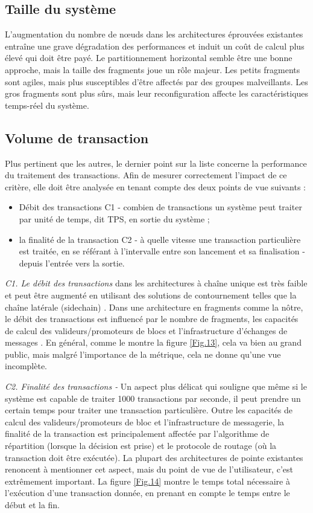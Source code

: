 \documentclass[journal]{IEEEtran}
\begin{document}
\subsection{Taille du système}
L'augmentation du nombre de nœuds dans les architectures éprouvées existantes entraîne une grave dégradation des performances et induit un coût de calcul plus élevé qui doit être payé. Le partitionnement horizontal semble être une bonne approche, mais la taille des fragments joue un rôle majeur. Les petits fragments sont agiles, mais plus susceptibles d'être affectés par des groupes malveillants. Les gros fragments sont plus sûrs, mais leur reconfiguration affecte les caractéristiques temps-réel du système.

\subsection{Volume de transaction}
Plus pertinent que les autres, le dernier point sur la liste concerne la performance du traitement des transactions.
Afin de mesurer correctement l'impact de ce critère, elle doit être analysée en tenant compte des deux points de vue suivants : 
\begin{itemize}
  \item  Débit des transactions C1 - combien de transactions un système peut traiter par unité de temps, dit TPS, en sortie du système \cite{51} ;
  \item  la finalité de la transaction C2 - à quelle vitesse une transaction particulière est traitée, en se référant à l'intervalle entre son lancement et sa finalisation - depuis l'entrée vers la sortie.
\end{itemize}

\textit{C1. Le débit des transactions} dans les architectures à chaîne unique est très faible et peut être augmenté en utilisant des solutions de contournement telles que la chaîne latérale (sidechain) \cite{52}. Dans une architecture en fragments comme la nôtre, le débit des transactions est influencé par le nombre de fragments, les capacités de calcul des valideurs/promoteurs de blocs et l'infrastructure d'échanges de messages \cite{8}. En général, comme le montre la figure \ref{Fig.13}, cela va bien au grand public, mais malgré l'importance de la métrique, cela ne donne qu'une vue incomplète.

\textit{C2. Finalité des transactions - } Un aspect plus délicat qui souligne que même si le système  est capable de traiter 1000 transactions par seconde, il peut prendre un certain temps pour traiter une transaction particulière. 
Outre les capacités de calcul des valideurs/promoteurs de bloc et l'infrastructure de messagerie, la finalité de la transaction est principalement affectée par l'algorithme de répartition (lorsque la décision est prise) et le protocole de routage (où la transaction doit être exécutée). La plupart des architectures de pointe existantes renoncent à mentionner cet aspect, mais du point de vue de l'utilisateur, c'est extrêmement important. La figure \ref{Fig.14} montre le temps total nécessaire à l'exécution d'une transaction donnée, en prenant en compte le temps entre le début et la fin. 
\end{document}
